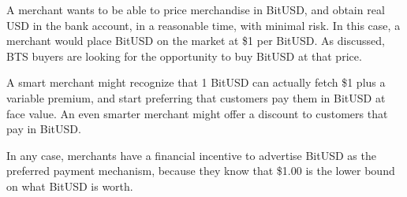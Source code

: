 A merchant wants to be able to price merchandise in BitUSD, and obtain real USD
in the bank account, in a reasonable time, with minimal risk. In this case, a
merchant would place BitUSD on the market at \$1 per BitUSD. As discussed, BTS
buyers are looking for the opportunity to buy BitUSD at that price.

A smart merchant might recognize that 1 BitUSD can actually fetch \$1 plus a
variable premium, and start preferring that customers pay them in BitUSD at
face value. An even smarter merchant might offer a discount to customers that
pay in BitUSD.

In any case, merchants have a financial incentive to advertise BitUSD as the
preferred payment mechanism, because they know that \$1.00 is the lower bound
on what BitUSD is worth.
